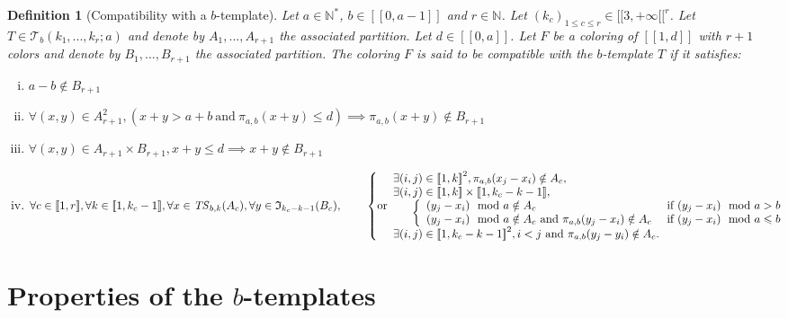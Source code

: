 \documentclass{article}
\newtheorem{definition}{Definition}[section]
\newcommand{\TS}{\mathit{TS}}
\begin{document}
\begin{definition}[Compatibility with a \(b\)-template]
Let \(a \in \mathbb{N}^*\), \(b \in [\![0, a - 1]\!]\) and \(r \in \mathbb{N}\). Let 
\((k_c)_{1 \leqslant c \leqslant r} \in {[\![3, + \infty [\![}^r\). Let \(T \in \mathcal{T}_b(k_1, ..., k_r; a)\) and 
denote by \(A_1, ..., A_{r+1}\) the associated partition. Let \(d \in [\![0, a]\!]\). Let \(F\) be a coloring of 
\([\![1, d]\!]\) with \(r +1\) colors and denote by \(B_1, ..., B_{r + 1}\) the associated partition. The coloring 
\(F\) is said to be compatible with the \(b\)-template \(T\) if it satisfies:
\begin{enumerate}[(i)]
\item \(a - b \notin B_{r + 1}\)
\item \(\forall (x,y) \in A_{r+1}^2, (x + y > a + b ~\text{and}~ \pi_{a, b}(x + y) \leqslant d) \implies \pi_{a, b}
	(x + y)  \notin B_{r+1}\)
\item \(\forall (x,y) \in A_{r+1} \times B_{r+1}, x + y \leqslant d \implies x + y  \notin B_{r+1}\)
\item \(\forall c \in [\![1, r]\!], \forall k \in [\![1, k_c-1]\!], \forall x \in \TS_{b, k}(A_c), \forall y \in 
	\mathfrak{I}_{k_c - k - 1}(B_c), \\
	\begin{array}{l}
		\mspace{30mu} 
		\left\{ \text{or} 
		\begin{array}{l}
			\exists (i, j) \in {[\![1, k]\!]}^2, \pi_{a, b}(x_j - x_i) \notin A_c, \\
			\exists (i, j) \in [\![1, k]\!] \times [\![1, k_c - k - 1]\!], \\
			\mspace{30mu}
				\left \{
				\begin{array}{l l}
					(y_j - x_i) \mod a \notin A_c & ~\text{if}~ (y_j - x_i) \mod a > b \\
					(y_j - x_i) \mod a \notin A_c ~\text{and}~ \pi_{a, b}(y_j - x_i) \notin A_c & ~\text{if}~ (y_j - x_i) \mod a 
						\leqslant b \\
				\end{array}
				\right. \\
			\exists (i, j) \in {[\![1, k_c - k - 1]\!]}^2, i < j ~\text{and}~ \pi_{a, b}(y_j - y_i) \notin A_c.
		\end{array}
		\right.
	\end{array}\)
\end{enumerate}
\end{definition}

\section{Properties of the \(b\)-templates}
\label{sec:results}
\end{document}
